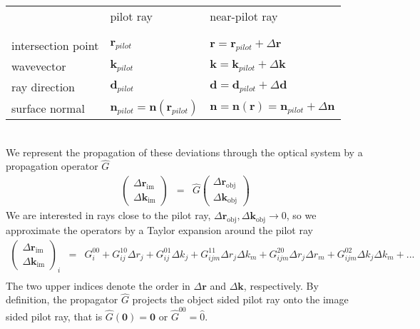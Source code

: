 \documentclass[12pt,a4paper,twoside,openright,BCOR10mm,headsepline,titlepage,abstracton,chapterprefix,final]{scrreprt}
\newcommand\Vector[1]{{\mathbf{#1}}}
\newcommand\wavenumber{k}
\newcommand\Wavevector{\Vector{\wavenumber}}
\newcommand\im{\textrm{im}}
\newcommand\obj{\textrm{obj}}
\begin{document}
\begin{tabular}{ l | l | l }
		    & pilot ray & near-pilot ray \\
& & \\ \hline & & \\
intersection point  & $\Vector{r}_{pilot}$ & ${\Vector{r}} = \Vector{r}_{pilot} + \Delta\Vector{r}$ \\
wavevector  & $\Wavevector_{pilot}$ & ${\Wavevector} = \Wavevector_{pilot} + \Delta\Wavevector$ \\
ray direction  & $\Vector{d}_{pilot}$ & ${\Vector{d}} = \Vector{d}_{pilot} + \Delta\Vector{d}$ \\
surface normal      & $\Vector{n}_{pilot} = \Vector{n}(\Vector{r}_{pilot})$ & ${\Vector{n}} = \Vector{n}({\Vector{r}}) = \Vector{n}_{pilot} + \Delta\Vector{n}$ \\
\end{tabular}\\[2ex]
We represent the propagation of these deviations through the optical system by a propagation operator $\hat{G}$
\begin{eqnarray}
 \begin{pmatrix}
  \Delta \Vector{r}_\im \\ \Delta \Wavevector_\im
 \end{pmatrix}
 &=&
 \hat{G}
 \begin{pmatrix}
  \Delta \Vector{r}_\obj \\ \Delta \Wavevector_\obj
 \end{pmatrix}
\end{eqnarray}
We are interested in rays close to the pilot ray, $\Delta \Vector{r}_\obj, \Delta \Wavevector_\obj \rightarrow 0$,
so we approximate the operators by a Taylor expansion around the pilot ray
\begin{eqnarray}
 \begin{pmatrix}
  \Delta \Vector{r}_\im \\ \Delta \Wavevector_\im
 \end{pmatrix}_i
 &=&
   G^{00}_i
 + G^{10}_{ij} \Delta r_j
 + G^{01}_{ij} \Delta k_j
 + G^{11}_{ijm} \Delta r_j \Delta k_m
 + G^{20}_{ijm} \Delta r_j \Delta r_m
 + G^{02}_{ijm} \Delta k_j \Delta k_m
 + ...\nonumber\\
\end{eqnarray}
The two upper indices denote the order in $\Delta \Vector{r}$ and $\Delta \Vector{k}$, respectively.
By definition, the propagator $\hat{G}$ projects the object sided pilot ray onto the image sided pilot ray,
that is $\hat{G}(\Vector{0}) = \Vector{0}$ or $\hat{G}^{00} = \hat{0}$. 
\end{document}
